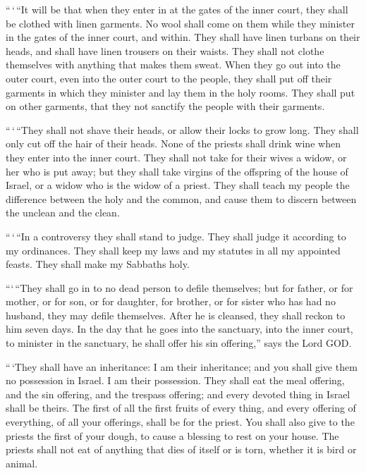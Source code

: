  ``\,`\,``It will be that when they enter in at the gates
of the inner court, they shall be clothed with linen garments. No wool
shall come on them while they minister in the gates of the inner court,
and within.  They shall have linen turbans on their heads,
and shall have linen trousers on their waists. They shall not clothe
themselves with anything that makes them sweat.  When they
go out into the outer court, even into the outer court to the people,
they shall put off their garments in which they minister and lay them in
the holy rooms. They shall put on other garments, that they not sanctify
the people with their garments.

 ``\,`\,``They shall not shave their heads, or allow their
locks to grow long. They shall only cut off the hair of their heads.
 None of the priests shall drink wine when they enter into
the inner court.  They shall not take for their wives a
widow, or her who is put away; but they shall take virgins of the
offspring of the house of Israel, or a widow who is the widow of a
priest.  They shall teach my people the difference between
the holy and the common, and cause them to discern between the unclean
and the clean.

 ``\,`\,``In a controversy they shall stand to judge. They
shall judge it according to my ordinances. They shall keep my laws and
my statutes in all my appointed feasts. They shall make my Sabbaths
holy.

 ```\,``They shall go in to no dead person to defile
themselves; but for father, or for mother, or for son, or for daughter,
for brother, or for sister who has had no husband, they may defile
themselves.  After he is cleansed, they shall reckon to him
seven days.  In the day that he goes into the sanctuary,
into the inner court, to minister in the sanctuary, he shall offer his
sin offering,'' says the Lord GOD.

 ``\,`They shall have an inheritance: I am their
inheritance; and you shall give them no possession in Israel. I am their
possession.  They shall eat the meal offering, and the sin
offering, and the trespass offering; and every devoted thing in Israel
shall be theirs.  The first of all the first fruits of
every thing, and every offering of everything, of all your offerings,
shall be for the priest. You shall also give to the priests the first of
your dough, to cause a blessing to rest on your house.  The
priests shall not eat of anything that dies of itself or is torn,
whether it is bird or animal.

